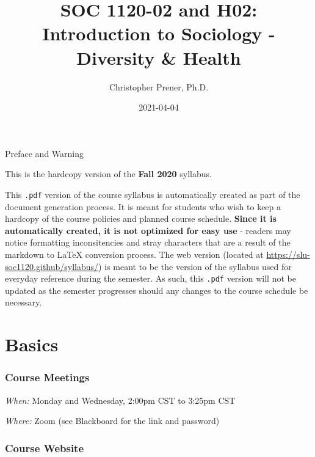 \documentclass[
]{book}
\title{SOC 1120-02 and H02: Introduction to Sociology - Diversity \& Health}
\author{Christopher Prener, Ph.D.}
\date{2021-04-04}
\begin{document}
\maketitle

\begin{center}
{\huge Preface and Warning} \\
\end{center}
\vspace{5mm}
This is the hardcopy version of the \textbf{Fall 2020} syllabus.
\vspace{5mm}
\par \noindent This \texttt{.pdf} version of the course syllabus is automatically created as part of the document generation process. It is meant for students who wish to keep a hardcopy of the course policies and planned course schedule. \textbf{Since it is automatically created, it is not optimized for easy use} - readers may notice formatting inconsitencies and stray characters that are a result of the markdown to \LaTeX{} conversion process. The web version (located at \href{https://slu-soc1120.github/syllabus/}{https://slu-soc1120.github/syllabus/}) is meant to be the version of the syllabus used for everyday reference during the semester. As such, this \texttt{.pdf} version will not be updated as the semester progresses should any changes to the course schedule be necessary.

\hypertarget{basics}{%
\chapter*{Basics}\label{basics}}

\hypertarget{course-meetings}{%
\subsection*{Course Meetings}\label{course-meetings}}

\emph{When:} Monday and Wednesday, 2:00pm CST to 3:25pm CST

\emph{Where:} Zoom (see Blackboard for the link and password)

\hypertarget{course-website}{%
\subsection*{Course Website}\label{course-website}}
\end{document}
